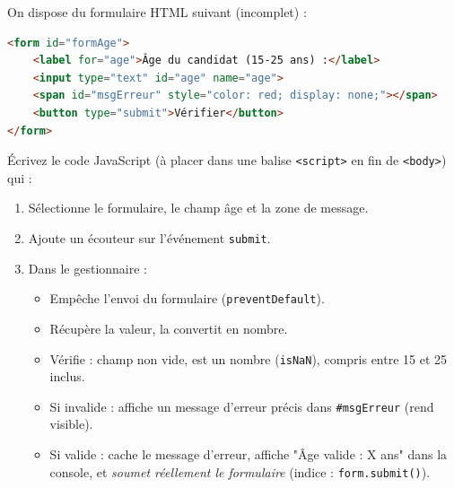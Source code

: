 \documentclass[11pt]{article}
\begin{document}
\begin{exercice}
On dispose du formulaire HTML suivant (incomplet) :
\begin{lstlisting}[language=HTML]
<form id="formAge">
    <label for="age">Âge du candidat (15-25 ans) :</label>
    <input type="text" id="age" name="age">
    <span id="msgErreur" style="color: red; display: none;"></span>
    <button type="submit">Vérifier</button>
</form>
\end{lstlisting}
Écrivez le code JavaScript (à placer dans une balise \texttt{<script>} en fin de \texttt{<body>}) qui :
\begin{enumerate}
    \item Sélectionne le formulaire, le champ âge et la zone de message.
    \item Ajoute un écouteur sur l'événement \texttt{submit}.
    \item Dans le gestionnaire :
        \begin{itemize}
            \item Empêche l'envoi du formulaire (\texttt{preventDefault}).
            \item Récupère la valeur, la convertit en nombre.
            \item Vérifie : champ non vide, est un nombre (\texttt{isNaN}), compris entre 15 et 25 inclus.
            \item Si invalide : affiche un message d'erreur précis dans \texttt{\#msgErreur} (rend visible).
            \item Si valide : cache le message d'erreur, affiche "Âge valide : X ans" dans la console, et \emph{soumet réellement le formulaire} (indice : \texttt{form.submit()}).
        \end{itemize}
\end{enumerate}
\end{exercice}
\end{document}
